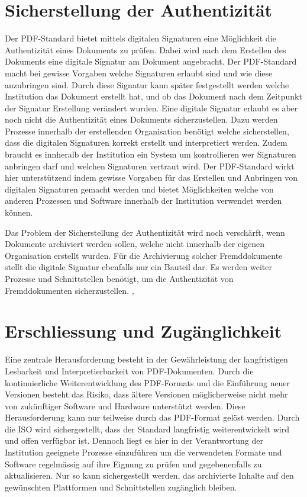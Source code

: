 \documentclass[a4paper,oneside, 12pt]{report}
\begin{document}
\section{Sicherstellung der Authentizität}
Der PDF-Standard bietet mittels digitalen Signaturen eine Möglichkeit die Authentizität eines Dokuments zu prüfen. Dabei wird nach dem Erstellen des Dokuments eine digitale Signatur am Dokument angebracht. Der PDF-Standard macht bei gewisse Vorgaben welche Signaturen erlaubt sind und wie diese anzubringen sind. Durch diese Signatur kann später festgestellt werden welche Institution das Dokument erstellt hat, und ob das Dokument nach dem Zeitpunkt der Signatur Erstellung verändert wurden. Eine digitale Signatur erlaubt es aber noch nicht die Authentizität eines Dokuments sicherzustellen. Dazu werden Prozesse innerhalb der erstellenden Organisation benötigt welche sicherstellen, dass die digitalen Signaturen korrekt erstellt und interpretiert werden. Zudem braucht es innheralb der Institution ein System um kontrollieren wer Signaturen anbringen darf und welchen Signaturen vertraut wird. Der PDF-Standard wirkt hier unterstützend indem gewisse Vorgaben für das Erstellen und Anbringen von digitalen Signaturen gemacht werden und bietet Möglichkeiten welche von anderen Prozessen und Software innerhalb der Institution verwendet werden können.

Das Problem der Sicherstellung der Authentizität wird noch verschärft, wenn Dokumente archiviert werden sollen, welche nicht innerhalb der eigenen Organisation erstellt wurden. Für die Archivierung solcher Fremddokumente stellt die digitale Signatur ebenfalls nur ein Bauteil dar. Es werden weiter Prozesse und Schnittstellen benötigt, um die Authentizität von Fremddokumenten sicherzustellen. \cite{pdftools}, \cite{pdfanutshell}



\section{Erschliessung und Zugänglichkeit}
 Eine zentrale Herausforderung besteht in der Gewährleistung der langfristigen Lesbarkeit und Interpretierbarkeit von \ac{PDF}-Dokumenten. Durch die kontinuierliche Weiterentwicklung des \ac{PDF}-Formats und die Einführung neuer Versionen besteht das Risiko, dass ältere Versionen möglicherweise nicht mehr von zukünftiger Software und Hardware unterstützt werden. Diese Herausforderung kann nur teilweise durch das PDF-Format gelöst werden. Durch die \ac{ISO} wird sichergestellt, dass der Standard langfristig weiterentwickelt wird und offen verfügbar ist. Dennoch liegt es hier in der Verantwortung der Institution geeignete Prozesse einzuführen um die verwendeten Formate und Software regelmässig auf ihre Eignung zu prüfen und gegebenenfalls zu aktualisieren. Nur so kann sichergestellt werden, das archivierte Inhalte auf den gewünschten Plattformen und Schnittstellen zugänglich bleiben. 
\end{document}
